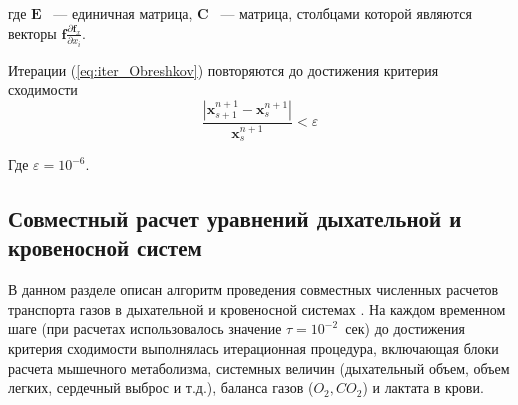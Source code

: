 где \(\mathbf{E}\) ~--- единичная матрица, \(\mathbf{C}\) ~--- матрица, столбцами которой являются векторы \(\mathbf{f}\displaystyle\frac{\partial \mathbf{f}_{x}}{\partial x_{i}}\).

Итерации (\ref{eq:iter_Obreshkov}) повторяются до достижения критерия сходимости
\begin{equation}
\frac{\left|\mathbf{x}_{s+1}^{n+1}-\mathbf{x}_{s}^{n+1}\right|}{\mathbf{x}_{s}^{n+1}} < \varepsilon
\end{equation}

Где $\varepsilon=10^{-6}$.
\subsection{Совместный расчет уравнений дыхательной и кровеносной систем}

В данном разделе описан алгоритм проведения совместных численных расчетов транспорта газов в дыхательной и кровеносной системах \cite{GolovCmodel2017}. На каждом временном шаге (при расчетах использовалось значение $\tau=10^{-2}$~сек) до достижения критерия сходимости выполнялась итерационная процедура, включающая блоки расчета мышечного метаболизма, системных величин (дыхательный объем, объем легких, сердечный выброс и т.д.), баланса газов ($O_2, CO_2$) и лактата в крови.


